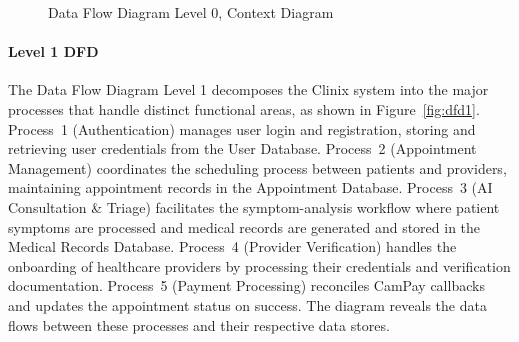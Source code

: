 \begin{figure}[H]
  \caption{Data Flow Diagram Level 0, Context Diagram}
  \label{fig:dfd0}
\end{figure}

\paragraph{Level 1 DFD}
The Data Flow Diagram Level 1 decomposes the Clinix system into the major processes that handle distinct functional areas, as shown in Figure~\ref{fig:dfd1}. Process~1 (Authentication) manages user login and registration, storing and retrieving user credentials from the User Database. Process~2 (Appointment Management) coordinates the scheduling process between patients and providers, maintaining appointment records in the Appointment Database. Process~3 (AI Consultation \& Triage) facilitates the symptom-analysis workflow where patient symptoms are processed and medical records are generated and stored in the Medical Records Database. Process~4 (Provider Verification) handles the onboarding of healthcare providers by processing their credentials and verification documentation. Process~5 (Payment Processing) reconciles CamPay callbacks and updates the appointment status on success. The diagram reveals the data flows between these processes and their respective data stores.

